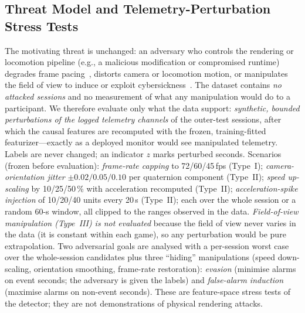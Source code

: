 \subsection{Threat Model and Telemetry-Perturbation Stress Tests}
\label{sec:threat}
The motivating threat is unchanged: an adversary who controls the rendering or locomotion pipeline (e.g., a malicious modification or compromised runtime) degrades frame pacing~\cite{odeleye2021framerate}, distorts camera or locomotion motion, or manipulates the field of view to induce or exploit cybersickness~\cite{tseng2022dark,kundu2025securing}. The dataset contains \emph{no attacked sessions} and no measurement of what any manipulation would do to a participant. We therefore evaluate only what the data support: \emph{synthetic, bounded perturbations of the logged telemetry channels} of the outer-test sessions, after which the causal features are recomputed with the frozen, training-fitted featurizer---exactly as a deployed monitor would see manipulated telemetry. Labels are never changed; an indicator $z$ marks perturbed seconds. Scenarios (frozen before evaluation): \emph{frame-rate capping} to 72/60/45\,fps (Type~I); \emph{camera-orientation jitter} $\pm0.02/0.05/0.10$ per quaternion component (Type~II); \emph{speed up-scaling} by 10/25/50\,\% with acceleration recomputed (Type~II); \emph{acceleration-spike injection} of 10/20/40 units every 20\,s (Type~II); each over the whole session or a random 60-s window, all clipped to the ranges observed in the data. \emph{Field-of-view manipulation (Type~III) is not evaluated} because the field of view never varies in the data (it is constant within each game), so any perturbation would be pure extrapolation. Two adversarial goals are analysed with a per-session worst case over the whole-session candidates plus three ``hiding'' manipulations (speed down-scaling, orientation smoothing, frame-rate restoration): \emph{evasion} (minimise alarms on event seconds; the adversary is given the labels) and \emph{false-alarm induction} (maximise alarms on non-event seconds). These are feature-space stress tests of the detector; they are not demonstrations of physical rendering attacks.

